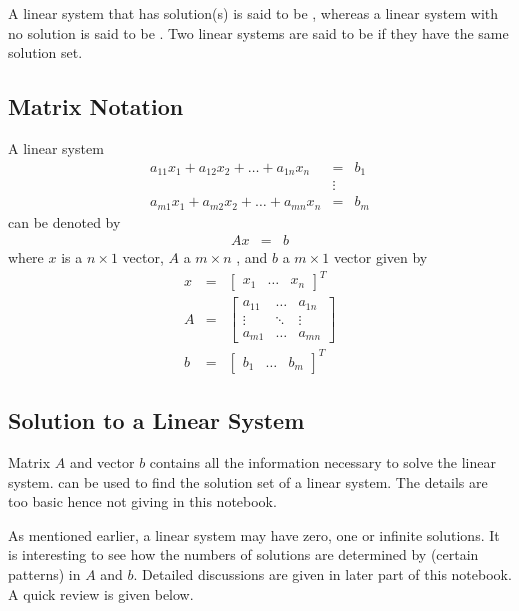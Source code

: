 A linear system that has solution(s) is said to be , whereas a linear system with no solution is said to be . Two linear systems are said to be  if they have the same solution set.

\subsection{Matrix Notation}

A linear system
\begin{eqnarray}
a_{11} x_1 + a_{12} x_2 + \ldots + a_{1n} x_n &=& b_1 \nonumber \\
& \vdots & \nonumber \\
a_{m1} x_1 + a_{m2} x_2 + \ldots + a_{mn} x_n &=& b_m \nonumber
\end{eqnarray}
can be denoted by
\begin{eqnarray}
Ax &=& b \label{eq:linear_system_matrix}
\end{eqnarray}
where $x$ is a $n\times 1$ vector, $A$ a $m\times n$ , and $b$ a $m\times 1$ vector given by
\begin{eqnarray}
  x &=& \left[\begin{array}{ccc}x_1 & \ldots & x_n\end{array}\right]^T \nonumber \\
  A &=& \left[\begin{array}{ccc}a_{11} & \ldots & a_{1n} \\
  \vdots & \ddots & \vdots \\
  a_{m1} & \ldots & a_{mn}
  \end{array}\right] \nonumber \\
  b &=& \left[\begin{array}{ccc}b_1 & \ldots & b_m\end{array}\right]^T \nonumber
\end{eqnarray}

\subsection{Solution to a Linear System}

Matrix $A$ and vector $b$ contains all the information necessary to solve the linear system.  can be used to find the solution set of a linear system. The details are too basic hence not giving in this notebook.

As mentioned earlier, a linear system may have zero, one or infinite solutions. It is interesting to see how the numbers of solutions are determined by (certain patterns) in $A$ and $b$. Detailed discussions are given in later part of this notebook. A quick review is given below.

